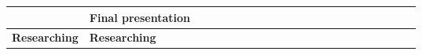 \begin{table}[ht]
\begin{tabular}{ll|llllllllllllllllllll|}
    \multicolumn{1}{|l|}{\cellcolor[HTML]{38FFF8}}                         & \cellcolor[HTML]{38FFF8}\textbf{Final presentation}                                                                  & \multicolumn{1}{l|}{}                                   & \multicolumn{1}{l|}{}                                   & \multicolumn{1}{l|}{}                                   & \multicolumn{1}{l|}{}                                   & \multicolumn{1}{l|}{}                                   & \multicolumn{1}{l|}{}                                   & \multicolumn{1}{l|}{}                                   & \multicolumn{1}{l|}{}                                   & \multicolumn{1}{l|}{}                                   & \multicolumn{1}{l|}{}                                    & \multicolumn{1}{l|}{}                                    & \multicolumn{1}{l|}{}                                    & \multicolumn{1}{l|}{}                                    & \multicolumn{1}{l|}{}                                    & \multicolumn{1}{l|}{}                                    & \multicolumn{1}{l|}{}                                    & \multicolumn{1}{l|}{}                                    & \multicolumn{1}{l|}{\cellcolor[HTML]{F8A102}}            & \multicolumn{1}{l|}{\cellcolor[HTML]{F8A102}}            &             \\ \hline
    \multicolumn{1}{|l|}{\cellcolor[HTML]{38FFF8}\textbf{Researching}}     & \cellcolor[HTML]{38FFF8}\textbf{Researching}                                                                         & \multicolumn{1}{l|}{}                                   & \multicolumn{1}{l|}{\cellcolor[HTML]{F8A102}}           & \multicolumn{1}{l|}{\cellcolor[HTML]{F8A102}}           & \multicolumn{1}{l|}{\cellcolor[HTML]{F8A102}}           & \multicolumn{1}{l|}{\cellcolor[HTML]{F8A102}}           & \multicolumn{1}{l|}{}                                   & \multicolumn{1}{l|}{}                                   & \multicolumn{1}{l|}{}                                   & \multicolumn{1}{l|}{}                                   & \multicolumn{1}{l|}{}                                    & \multicolumn{1}{l|}{}                                    & \multicolumn{1}{l|}{}                                    & \multicolumn{1}{l|}{}                                    & \multicolumn{1}{l|}{}                                    & \multicolumn{1}{l|}{}                                    & \multicolumn{1}{l|}{}                                    & \multicolumn{1}{l|}{}                                    & \multicolumn{1}{l|}{}                                    & \multicolumn{1}{l|}{}                                    &             \\ \hline

\end{tabular}
\end{table}

